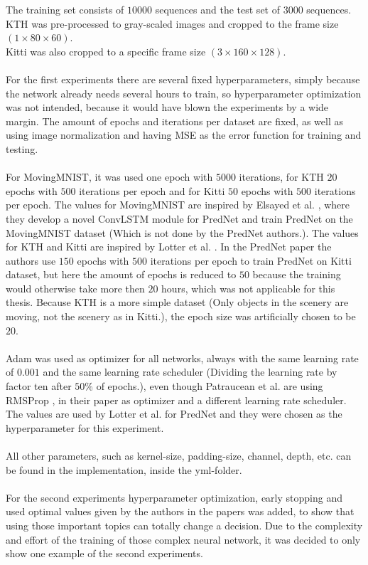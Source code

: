   The training set consists of $10000$ sequences and the test set of $3000$ sequences.\\
  KTH was pre-processed to gray-scaled images and cropped to the frame size $(1 \times 80 \times 60)$.\\
  Kitti was also cropped to a specific frame size $(3 \times 160 \times 128)$.
  \\\\
  For the first experiments there are several fixed hyperparameters, simply because the network already needs several hours to train, so hyperparameter 
  optimization was not intended, because it would have blown the experiments by a wide margin.
  The amount of epochs and iterations per dataset are fixed, as well as using image normalization and having MSE as the
  error function for training and testing.
  \\\\
  For MovingMNIST, it was used one epoch with $5000$ iterations, for KTH $20$ epochs with $500$ iterations per epoch and for Kitti $50$ epochs with $500$ 
  iterations per epoch. The values for MovingMNIST are inspired by Elsayed et al. \cite{Elsayed2018}, where they develop a novel ConvLSTM module for PredNet and 
  train PredNet on the MovingMNIST dataset (Which is not done by the PredNet authors.).
  The values for KTH and Kitti are inspired by Lotter et al. \cite{Lotter2016}.
  In the PredNet paper the authors use $150$ epochs with $500$ iterations per epoch to train PredNet on Kitti dataset, but here the amount of epochs is reduced to
  $50$ because the training would otherwise take more then $20$ hours, which was not applicable for this thesis. Because KTH is a more \glqq simple\grqq{} dataset 
  (Only 
  objects in the scenery are moving, not the scenery as in Kitti.), the epoch size was artificially chosen to be $20$.
  \\\\
  Adam \cite{Kingma2015} was used as optimizer for all networks, always with the same learning rate of $0.001$ and the same learning rate scheduler (Dividing the 
  learning rate by factor ten after $50$\% of epochs.), even though 
  Patraucean et al. \cite{Patraucean2015} are using RMSProp \cite{Ruder2016}, in their paper as optimizer and a different learning rate scheduler.
  The values are used by Lotter et al. \cite{Lotter2016} for PredNet and they were chosen as the hyperparameter for this experiment.
  \\\\
  All other parameters, such as kernel-size, padding-size, channel, depth, etc. can be found in the implementation, inside the yml-folder.  
  \\\\
  For the second experiments hyperparameter optimization, early stopping and used \glqq optimal values\grqq{} given by the authors in the papers was added,
  to show that using those important topics can totally change a decision.
  Due to the complexity and effort of the training of those complex neural network, it was decided to only show one example of the second experiments.
  
